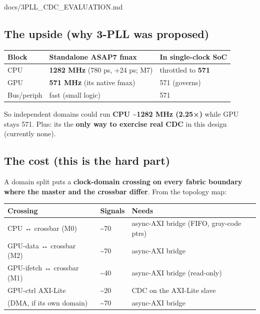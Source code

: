 \begin{relocated}{docs/3PLL_CDC_EVALUATION.md}
\subsection{The upside (why 3-PLL was proposed)}\label{tm:dec:3pll-cdc:2-the-upside-why-3-pll-was-proposed}

{
\begin{longtable}[]{@{}lll@{}}
\toprule\noalign{}
Block & Standalone ASAP7 fmax & In single-clock SoC \\
\midrule\noalign{}
\endhead
\bottomrule\noalign{}
\endlastfoot
CPU & \textbf{1282 MHz} (780 ps, +24 ps; M7) & throttled to
\textbf{571} \\
GPU & \textbf{571 MHz} (its native fmax) & 571 (governs) \\
Bus/\allowbreak{}periph & fast (small logic) & 571 \\
\end{longtable}
}

So independent domains could run \textbf{CPU \textasciitilde1282 MHz
(2.25×)} while GPU stays 571. Plus: it\textquotesingle s the
\textbf{only way to exercise real CDC} in this design (currently none).

\subsection{The cost (this is the hard part)}\label{tm:dec:3pll-cdc:3-the-cost-this-is-the-hard-part}

A domain split puts a \textbf{clock-domain crossing on every fabric
boundary where the master and the crossbar differ}. From the topology
map:

{
\begin{longtable}[]{@{}
  >{\raggedright\arraybackslash}p{}
  >{\raggedleft\arraybackslash}p{}
  >{\raggedright\arraybackslash}p{}@{}}
\toprule\noalign{}
\begin{minipage}[b]{\linewidth}\raggedright
Crossing
\end{minipage} & \begin{minipage}[b]{\linewidth}\raggedleft
Signals
\end{minipage} & \begin{minipage}[b]{\linewidth}\raggedright
Needs
\end{minipage} \\
\midrule\noalign{}
\endhead
\bottomrule\noalign{}
\endlastfoot
CPU ↔ crossbar (M0) & \textasciitilde70 & async-AXI bridge (FIFO,
gray-code ptrs) \\
GPU-data ↔ crossbar (M2) & \textasciitilde70 & async-AXI bridge \\
GPU-ifetch ↔ crossbar (M1) & \textasciitilde40 & async-AXI bridge
(read-only) \\
GPU-ctrl AXI-Lite & \textasciitilde20 & CDC on the AXI-Lite slave \\
(DMA, if its own domain) & \textasciitilde70 & async-AXI bridge \\
\end{longtable}
}


\end{relocated}
